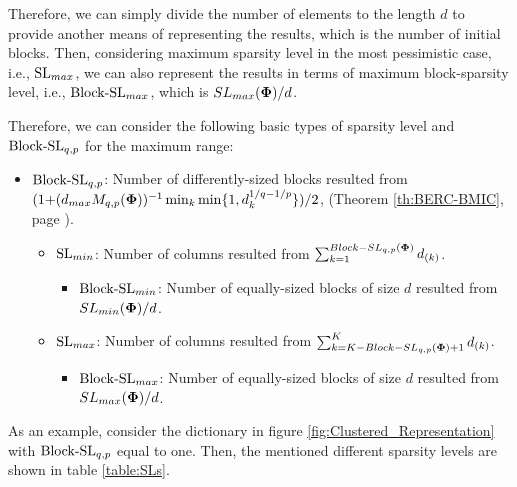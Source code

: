 Therefore, we can simply divide the number of elements to the length $d$ to provide another means of representing the results, which is the number of initial blocks.
Then, considering maximum sparsity level in the most pessimistic case, i.e., $\mathrm{SL}_{max}$, we can also represent the results in terms of maximum block-sparsity level, i.e., $\mathrm{Block\text{{-}}SL}_{max}$, which is $SL_{max}(\boldsymbol{\Phi}) {/} d$. 

Therefore, we can consider the following basic types of sparsity level and $\mathrm{Block\text{{-}}SL}_{q,p}$ for the maximum range:
\begin{itemize}
\item $\mathrm{Block\text{{-}}SL}_{q,p}$: Number of differently-sized blocks resulted from $(1 {+} (d_{max} M_{q,p}(\boldsymbol{\Phi}))^{-1} \min_k \min \{1 , d_k^{1/q {-} 1/p} \} )/2$, (Theorem \ref{th:BERC-BMIC}, page \pageref{th:BERC-BMIC}).
\begin{itemize}
\item $\mathrm{SL}_{min}$: Number of columns resulted from $\sum_{k {=} 1}^{Block{-}SL_{q,p}(\boldsymbol{\Phi})} d_{\left( k \right)}$.
\begin{itemize}
\item $\mathrm{Block\text{{-}}SL}_{min}$: Number of equally-sized blocks of size $d$ resulted from $SL_{min}(\boldsymbol{\Phi}) {/} d$.
\end{itemize}
\end{itemize}
\begin{itemize}
\item $\mathrm{SL}_{max}$: Number of columns resulted from $\sum_{k {=} K {-} Block{-}SL_{q,p}(\boldsymbol{\Phi}) {+} 1}^{K}d_{(k)}$.
\begin{itemize}
\item $\mathrm{Block\text{{-}}SL}_{max}$: Number of equally-sized blocks of size $d$ resulted from $SL_{max}(\boldsymbol{\Phi}) {/} d$.
\end{itemize}
\end{itemize}
\end{itemize}
As an example, consider the dictionary in figure \ref{fig:Clustered_Representation} with 
$\mathrm{Block\text{{-}}SL}_{q,p}$ equal to one. 
Then, the mentioned different sparsity levels are shown in table \ref{table:SLs}.

